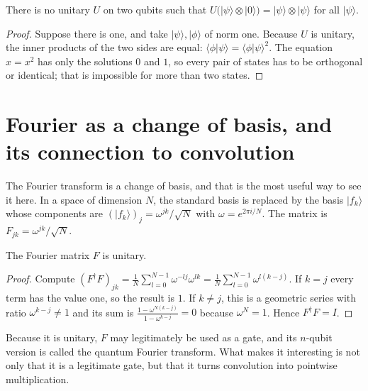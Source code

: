 \begin{proposisi}[No cloning]
There is no unitary $U$ on two qubits such that
$U\bigl(|\psi\rangle\otimes|0\rangle\bigr)=|\psi\rangle\otimes|\psi\rangle$ for all
$|\psi\rangle$.
\end{proposisi}

\begin{proof}
Suppose there is one, and take $|\psi\rangle,|\phi\rangle$ of norm one. Because $U$ is
unitary, the inner products of the two sides are equal:
$\langle\phi|\psi\rangle=\langle\phi|\psi\rangle^2$. The equation $x=x^2$ has only the
solutions $0$ and $1$, so every pair of states has to be orthogonal or identical; that is
impossible for more than two states.
\end{proof}


\section{Fourier as a change of basis, and its connection to convolution}

The Fourier transform is a change of basis, and that is the most useful way to see it
here. In a space of dimension $N$, the standard basis is replaced by the basis
$|f_k\rangle$ whose components are $(|f_k\rangle)_j=\omega^{jk}/\sqrt{N}$ with
$\omega=e^{2\pi i/N}$. The matrix is $F_{jk}=\omega^{jk}/\sqrt{N}$.

\begin{proposisi}
The Fourier matrix $F$ is unitary.
\end{proposisi}

\begin{proof}
Compute $(F^{\dagger}F)_{jk}=\frac{1}{N}\sum_{l=0}^{N-1}\omega^{-lj}\omega^{lk}
=\frac{1}{N}\sum_{l=0}^{N-1}\omega^{l(k-j)}$. If $k=j$ every term has the value one, so
the result is $1$. If $k\neq j$, this is a geometric series with ratio
$\omega^{k-j}\neq1$ and its sum is $\frac{1-\omega^{N(k-j)}}{1-\omega^{k-j}}=0$ because
$\omega^{N}=1$. Hence $F^{\dagger}F=I$.
\end{proof}

Because it is unitary, $F$ may legitimately be used as a gate, and its $n$-qubit version
is called the quantum Fourier transform. What makes it interesting is not only that it is
a legitimate gate, but that it turns convolution into pointwise multiplication.

